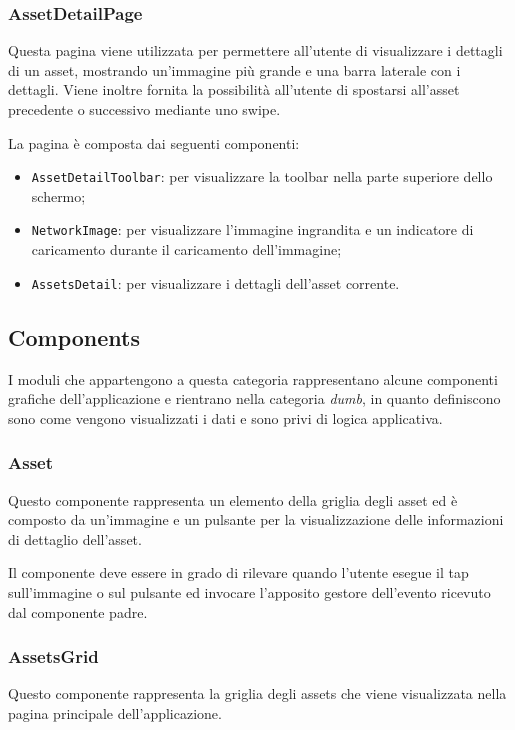 \subsubsection{AssetDetailPage}

Questa pagina viene utilizzata per permettere all'utente di visualizzare i dettagli di un asset, mostrando un'immagine più grande e una barra laterale con i dettagli.
Viene inoltre fornita la possibilità all'utente di spostarsi all'asset precedente o successivo mediante uno swipe.

La pagina è composta dai seguenti componenti:
\begin{itemize}
\item \texttt{AssetDetailToolbar}: per visualizzare la toolbar nella parte superiore dello schermo;
\item \texttt{NetworkImage}: per visualizzare l'immagine ingrandita e un indicatore di caricamento durante il caricamento dell'immagine;
\item \texttt{AssetsDetail}: per visualizzare i dettagli dell'asset corrente.
\end{itemize}

\subsection{Components}

I moduli che appartengono a questa categoria rappresentano alcune componenti grafiche dell'applicazione e rientrano nella categoria \textit{dumb}, in quanto definiscono sono come vengono visualizzati i dati e sono privi di logica applicativa.

\subsubsection{Asset}

Questo componente rappresenta un elemento della griglia degli asset ed è composto da un'immagine e un pulsante per la visualizzazione delle informazioni di dettaglio dell'asset.

Il componente deve essere in grado di rilevare quando l'utente esegue il tap sull'immagine o sul pulsante ed invocare l'apposito gestore dell'evento ricevuto dal componente padre.

\subsubsection{AssetsGrid}

Questo componente rappresenta la griglia degli assets che viene visualizzata nella pagina principale dell'applicazione.

